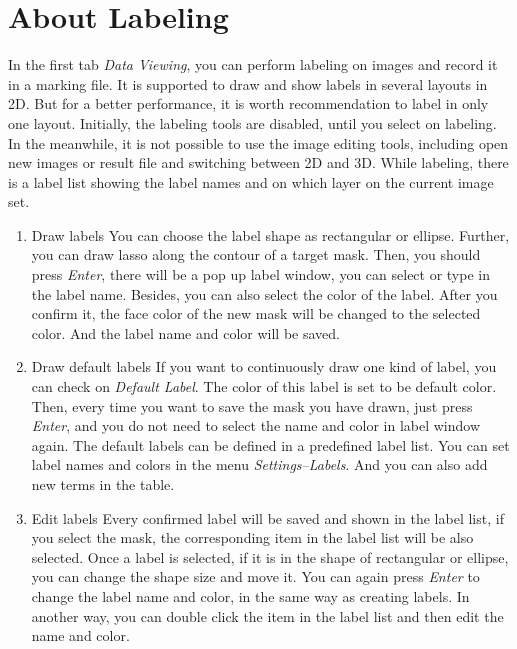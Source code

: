 \documentclass[12pt]{article}
\begin{document}
\graphicspath{ {images/} }
\section*{About Labeling}

In the first tab \textit{Data Viewing}, you can perform labeling on images and record it in a marking file. It is supported to draw and show labels in several layouts in 2D. But for a better performance, it is worth recommendation to label in only one layout. Initially, the labeling tools are disabled, until you select on labeling. In the meanwhile, it is not possible to use the image editing tools, including open new images or result file and switching between 2D and 3D. While labeling, there is a label list showing the label names and on which layer on the current image set.
\begin{enumerate}
	\item Draw labels
	\newline You can choose the label shape as rectangular or ellipse. Further, you can draw lasso along the contour of a target mask. Then, you should press \textit{Enter}, there will be a pop up label window, you can select or type in the label name. Besides, you can also select the color of the label. After you confirm it, the face color of the new mask will be changed to the selected color. And the label name and color will be saved.
	
	\item Draw default labels
	\newline If you want to continuously draw one kind of label, you can check on \textit{Default Label}. The color of this label is set to be default color. Then, every time you want to save the mask you have drawn, just press \textit{Enter}, and you do not need to select the name and color in label window again. The default labels can be defined in a predefined label list. You can set label names and colors in the menu \textit{Settings--Labels}. And you can also add new terms in the table.
	
	\item Edit labels
	\newline Every confirmed label will be saved and shown in the label list, if you select the mask, the corresponding item in the label list will be also selected. Once a label is selected, if it is in the shape of rectangular or ellipse, you can change the shape size and move it. You can again press \textit{Enter} to change the label name and color, in the same way as creating labels. In another way, you can double click the item in the label list and then edit the name and color.
	

\end{enumerate}
\end{document}
